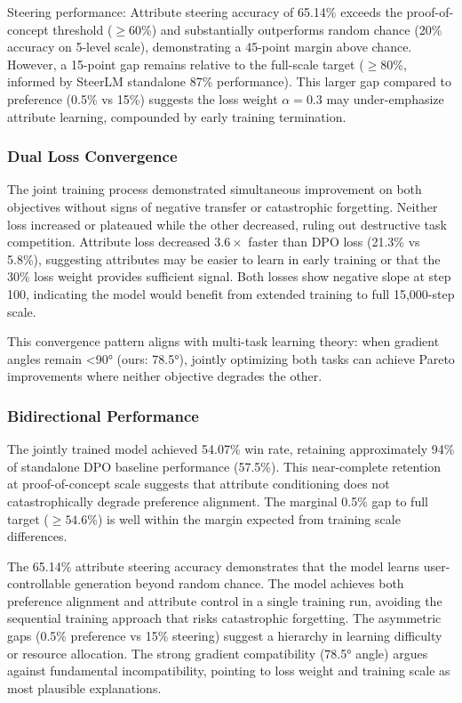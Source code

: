 Steering performance: Attribute steering accuracy of 65.14\% exceeds the proof-of-concept threshold ($\geq 60$\%) and substantially outperforms random chance (20\% accuracy on 5-level scale), demonstrating a 45-point margin above chance. However, a 15-point gap remains relative to the full-scale target ($\geq 80$\%, informed by SteerLM standalone 87\% performance). This larger gap compared to preference (0.5\% vs 15\%) suggests the loss weight $\alpha =0.3$ may under-emphasize attribute learning, compounded by early training termination.

\subsubsection{Dual Loss Convergence}

The joint training process demonstrated simultaneous improvement on both objectives without signs of negative transfer or catastrophic forgetting. Neither loss increased or plateaued while the other decreased, ruling out destructive task competition. Attribute loss decreased 3.$6\times$ faster than DPO loss (21.3\% vs 5.8\%), suggesting attributes may be easier to learn in early training or that the 30\% loss weight provides sufficient signal. Both losses show negative slope at step 100, indicating the model would benefit from extended training to full 15,000-step scale.

This convergence pattern aligns with multi-task learning theory: when gradient angles remain <90° (ours: 78.5°), jointly optimizing both tasks can achieve Pareto improvements where neither objective degrades the other.

\subsubsection{Bidirectional Performance}

The jointly trained model achieved 54.07\% win rate, retaining approximately 94\% of standalone DPO baseline performance (57.5\%). This near-complete retention at proof-of-concept scale suggests that attribute conditioning does not catastrophically degrade preference alignment. The marginal 0.5\% gap to full target ($\geq 54.6$\%) is well within the margin expected from training scale differences.

The 65.14\% attribute steering accuracy demonstrates that the model learns user-controllable generation beyond random chance. The model achieves both preference alignment and attribute control in a single training run, avoiding the sequential training approach that risks catastrophic forgetting. The asymmetric gaps (0.5\% preference vs 15\% steering) suggest a hierarchy in learning difficulty or resource allocation. The strong gradient compatibility (78.5° angle) argues against fundamental incompatibility, pointing to loss weight and training scale as most plausible explanations.

